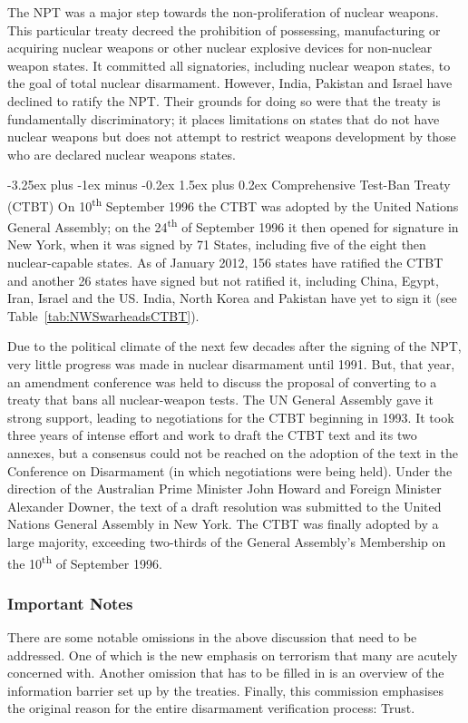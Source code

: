 \documentclass[twoside,titlepage,11pt,twocolumn,a4paper]{article}
\makeatletter
\renewcommand{\paragraph}{\@startsection{paragraph}{4}{0ex}%
   {-3.25ex plus -1ex minus -0.2ex}%
   {1.5ex plus 0.2ex}%
   {\normalfont\normalsize\bfseries}}
\makeatother
\begin{document}
The NPT was a major step towards the non-proliferation of nuclear
weapons. This particular treaty decreed the prohibition of possessing,
manufacturing or acquiring nuclear weapons or other nuclear explosive
devices for non-nuclear weapon states. It committed all signatories,
including nuclear weapon states, to the goal of total nuclear
disarmament. However, India, Pakistan and Israel have declined to
ratify the NPT. Their grounds for doing so were that the treaty is
fundamentally discriminatory; it places limitations on states that do
not have nuclear weapons but does not attempt to restrict weapons
development by those who are declared nuclear weapons states.

\paragraph{Comprehensive Test-Ban Treaty (CTBT)}
On 10\textsuperscript{th} September 1996 the CTBT was adopted by the
United Nations General Assembly; on the 24\textsuperscript{th} of
September 1996 it then opened for signature in New York, when it was
signed by 71 States, including five of the eight then nuclear-capable
states. As of January 2012, 156 states have ratified the CTBT and
another 26 states have signed but not ratified it, including China,
Egypt, Iran, Israel and the US. India, North Korea and
Pakistan have yet to sign it (see Table~\ref{tab:NWSwarheadsCTBT}).

Due to the political climate of the next few decades after the signing
of the NPT, very little progress was made in nuclear disarmament until
1991. But, that year, an amendment conference was held to discuss the
proposal of converting to a treaty that bans all nuclear-weapon
tests. The UN General Assembly gave it strong support, leading to
negotiations for the CTBT beginning in 1993. It took three years of
intense effort and work to draft the CTBT text and its two annexes,
but a consensus could not be reached on the adoption of the text in
the Conference on Disarmament (in which negotiations were being
held). Under the direction of the Australian Prime Minister John
Howard and Foreign Minister Alexander Downer, the text of a draft
resolution was submitted to the United Nations General Assembly in New
York. The CTBT was finally adopted by a large majority, exceeding
two-thirds of the General Assembly's Membership on the
10\textsuperscript{th} of September 1996.

\subsubsection{Important Notes}
There are some notable omissions in the above discussion that need to
be addressed. One of which is the new emphasis on terrorism that many
are acutely concerned with. Another omission that has to be filled in
is an overview of the information barrier set up by the
treaties. Finally, this commission emphasises the original reason for
the entire disarmament verification process: Trust.
\end{document}
